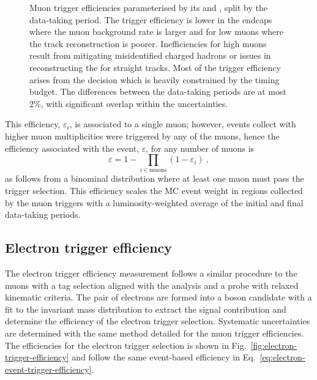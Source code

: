 \begin{figure}[htbp]
\begin{subfigure}[b]{0.49\textwidth}
    \end{subfigure}
    \caption{
        Muon trigger efficiencies parameterised by its \pt and \aeta, split by
        the data-taking period. The trigger efficiency is lower in the endcaps
        where the muon background rate is larger and for low \pt muons where
        the track reconstruction is poorer. Inefficiencies for high \pt muons
        result from mitigating misidentified charged hadrons or issues in
        reconstructing the \pt for straight tracks. Most of the trigger
        efficiency arises from the \HWT decision which is heavily constrained
        by the timing budget. The differences between the data-taking periods
        are at most $2\%$, with significant overlap within the uncertainties.
    }
    \label{fig:muon-trigger-efficiency}
\end{figure}

This efficiency, $\varepsilon_i$, is associated to a single muon; however,
events collect with higher muon multiplicities were triggered by any of the
muons, hence the efficiency associated with the event, $\varepsilon$, for any
number of muons is
%
\begin{equation}\label{eq:electron-event-trigger-efficiency}
    \varepsilon = 1 - \prod_{i\in\mathrm{muons}} ( 1 - \varepsilon_i )\ ,
\end{equation}
%
as follows from a binominal distribution where at least one muon must pass the
trigger selection. This efficiency scales the MC event weight in regions
collected by the muon triggers with a luminosity-weighted average of the
initial and final data-taking periods.


\subsection{Electron trigger efficiency}

The electron trigger efficiency measurement \cite{CMS-DP-2017-004} follows a
similar procedure to the muons with a tag selection aligned with the analysis
and a probe with relaxed kinematic criteria. The pair of electrons are formed
into a \PZ boson candidate with a fit to the invariant mass distribution to
extract the signal contribution and determine the efficiency of the electron
trigger selection. Systematic uncertainties are determined with the same
method detailed for the muon trigger efficiencies. The efficiencies for the
electron trigger selection is shown in
Fig.~\ref{fig:electron-trigger-efficiency} and follow the same event-based
efficiency in Eq.~\ref{eq:electron-event-trigger-efficiency}.

